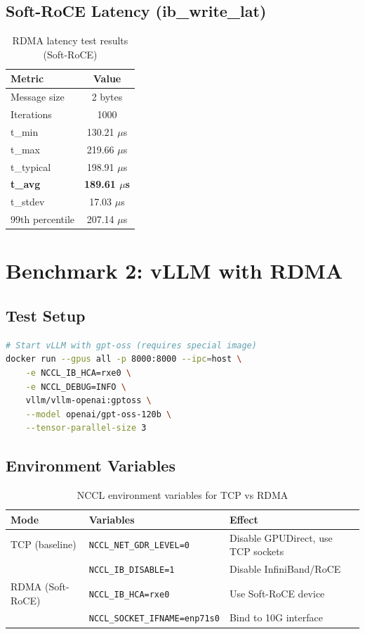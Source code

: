 \documentclass[10pt,letterpaper]{article}
\begin{document}
\subsection{Soft-RoCE Latency (ib\_write\_lat)}

\begin{table}[H]
\centering
\small
\begin{tabular}{@{}lc@{}}
\toprule
\textbf{Metric} & \textbf{Value} \\
\midrule
Message size & 2 bytes \\
Iterations & 1000 \\
t\_min & 130.21 $\mu$s \\
t\_max & 219.66 $\mu$s \\
t\_typical & 198.91 $\mu$s \\
\textbf{t\_avg} & \textbf{189.61 $\mu$s} \\
t\_stdev & 17.03 $\mu$s \\
99th percentile & 207.14 $\mu$s \\
\bottomrule
\end{tabular}
\caption{RDMA latency test results (Soft-RoCE)}
\end{table}

\section{Benchmark 2: vLLM with RDMA}

\subsection{Test Setup}

\begin{lstlisting}[language=bash]
# Start vLLM with gpt-oss (requires special image)
docker run --gpus all -p 8000:8000 --ipc=host \
    -e NCCL_IB_HCA=rxe0 \
    -e NCCL_DEBUG=INFO \
    vllm/vllm-openai:gptoss \
    --model openai/gpt-oss-120b \
    --tensor-parallel-size 3
\end{lstlisting}

\subsection{Environment Variables}

\begin{table}[H]
\centering
\small
\begin{tabular}{@{}llp{6cm}@{}}
\toprule
\textbf{Mode} & \textbf{Variables} & \textbf{Effect} \\
\midrule
TCP (baseline) & \texttt{NCCL\_NET\_GDR\_LEVEL=0} & Disable GPUDirect, use TCP sockets \\
 & \texttt{NCCL\_IB\_DISABLE=1} & Disable InfiniBand/RoCE \cite{nccl-env} \\
\midrule
RDMA (Soft-RoCE) & \texttt{NCCL\_IB\_HCA=rxe0} & Use Soft-RoCE device \\
 & \texttt{NCCL\_SOCKET\_IFNAME=enp71s0} & Bind to 10G interface \\
\bottomrule
\end{tabular}
\caption{NCCL environment variables for TCP vs RDMA}
\end{table}
\end{document}
